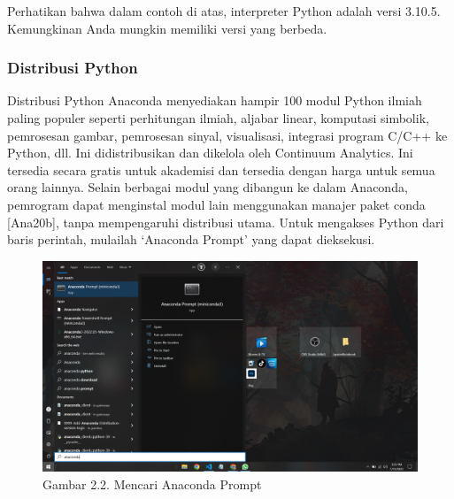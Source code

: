 \documentclass[
  letterpaper,
  DIV=11,
  numbers=noendperiod]{scrreprt}
\begin{document}
\begin{tcolorbox}[enhanced jigsaw, opacityback=0, colbacktitle=quarto-callout-tip-color!10!white, breakable, titlerule=0mm, left=2mm, toptitle=1mm, rightrule=.15mm, leftrule=.75mm, colback=white, opacitybacktitle=0.6, arc=.35mm, toprule=.15mm, coltitle=black, colframe=quarto-callout-tip-color-frame, bottomtitle=1mm, title=\textcolor{quarto-callout-tip-color}{\faLightbulb}\hspace{0.5em}{Tip}, bottomrule=.15mm]

Perhatikan bahwa dalam contoh di atas, interpreter Python adalah versi
3.10.5. Kemungkinan Anda mungkin memiliki versi yang berbeda.

\end{tcolorbox}

\hypertarget{distribusi-python}{%
\subsubsection*{Distribusi Python}\label{distribusi-python}}

Distribusi Python Anaconda menyediakan hampir 100 modul Python ilmiah
paling populer seperti perhitungan ilmiah, aljabar linear, komputasi
simbolik, pemrosesan gambar, pemrosesan sinyal, visualisasi, integrasi
program C/C++ ke Python, dll. Ini didistribusikan dan dikelola oleh
Continuum Analytics. Ini tersedia secara gratis untuk akademisi dan
tersedia dengan harga untuk semua orang lainnya. Selain berbagai modul
yang dibangun ke dalam Anaconda, pemrogram dapat menginstal modul lain
menggunakan manajer paket conda {[}Ana20b{]}, tanpa mempengaruhi
distribusi utama. Untuk mengakses Python dari baris perintah, mulailah
`Anaconda Prompt' yang dapat dieksekusi.

\begin{figure}

{\centering \includegraphics{Asset/image7.png}

}

\caption{Gambar 2.2. Mencari Anaconda Prompt}

\end{figure}
\end{document}

